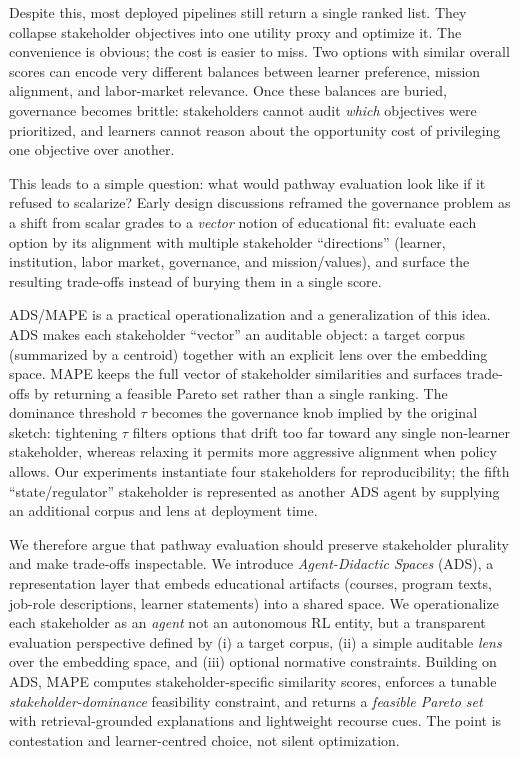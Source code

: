 \documentclass[sigconf,review]{acmart}
\newcommand{\ADS}{\textsc{ADS}\xspace}
\newcommand{\MAPE}{\textsc{MAPE}\xspace}
\begin{document}
Despite this, most deployed pipelines still return a single ranked list. They collapse stakeholder objectives into one utility proxy and optimize it. The convenience is obvious; the cost is easier to miss. Two options with similar overall scores can encode very different balances between learner preference, mission alignment, and labor-market relevance. Once these balances are buried, governance becomes brittle: stakeholders cannot audit \emph{which} objectives were prioritized, and learners cannot reason about the opportunity cost of privileging one objective over another.

This leads to a simple question: what would pathway evaluation look like if it refused to scalarize? Early design discussions reframed the governance problem as a shift from scalar grades to a \emph{vector} notion of educational fit: evaluate each option by its alignment with multiple stakeholder ``directions'' (learner, institution, labor market, governance, and mission/values), and surface the resulting trade-offs instead of burying them in a single score.

\ADS/\MAPE is a practical operationalization   and a generalization   of this idea. \ADS makes each stakeholder ``vector'' an auditable object: a target corpus (summarized by a centroid) together with an explicit lens over the embedding space. \MAPE keeps the full vector of stakeholder similarities and surfaces trade-offs by returning a feasible Pareto set rather than a single ranking. The dominance threshold $\tau$ becomes the governance knob implied by the original sketch: tightening $\tau$ filters options that drift too far toward any single non-learner stakeholder, whereas relaxing it permits more aggressive alignment when policy allows. Our experiments instantiate four stakeholders for reproducibility; the fifth ``state/regulator'' stakeholder is represented as another \ADS agent by supplying an additional corpus and lens at deployment time.

We therefore argue that pathway evaluation should preserve stakeholder plurality and make trade-offs inspectable. We introduce \emph{Agent-Didactic Spaces} (\ADS), a representation layer that embeds educational artifacts (courses, program texts, job-role descriptions, learner statements) into a shared space. We operationalize each stakeholder as an \emph{agent}   not an autonomous RL entity, but a transparent evaluation perspective defined by (i) a target corpus, (ii) a simple auditable \emph{lens} over the embedding space, and (iii) optional normative constraints. Building on \ADS, \MAPE computes stakeholder-specific similarity scores, enforces a tunable \emph{stakeholder-dominance} feasibility constraint, and returns a \emph{feasible Pareto set} with retrieval-grounded explanations and lightweight recourse cues. The point is contestation and learner-centred choice, not silent optimization.
\end{document}
